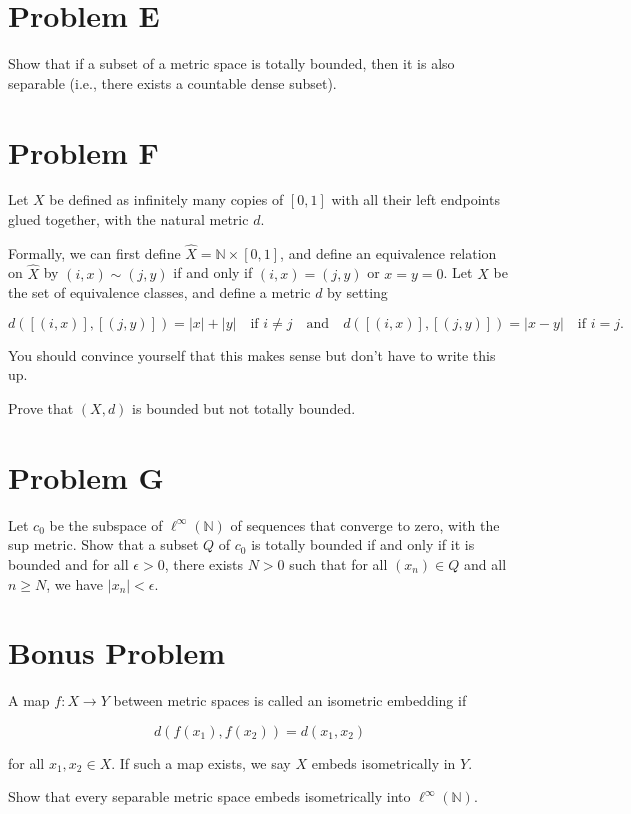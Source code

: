 \documentclass[lang=en,11pt]{template}
\begin{document}
\section*{Problem E}
Show that if a subset of a metric space is totally bounded, then it is also separable (i.e., there exists a countable dense subset).

\section*{Problem F}
Let \( X \) be defined as infinitely many copies of \( [0, 1] \) with all their left endpoints glued together, with the natural metric \( d \).

Formally, we can first define \( \hat{X} = \mathbb{N} \times [0, 1] \), and define an equivalence relation on \( \hat{X} \) by \( (i, x) \sim (j, y) \) if and only if \( (i, x) = (j, y) \) or \( x = y = 0 \). Let \( X \) be the set of equivalence classes, and define a metric \( d \) by setting

\[
d([ (i, x) ], [ (j, y) ]) = |x| + |y| \quad \text{if } i \neq j \quad \text{and} \quad d([ (i, x) ], [ (j, y) ]) = |x - y| \quad \text{if } i = j.
\]

You should convince yourself that this makes sense but don’t have to write this up.

Prove that \( (X, d) \) is bounded but not totally bounded.

\section*{Problem G}
Let \( c_0 \) be the subspace of \( \ell^\infty(\mathbb{N}) \) of sequences that converge to zero, with the sup metric. Show that a subset \( Q \) of \( c_0 \) is totally bounded if and only if it is bounded and for all \( \epsilon > 0 \), there exists \( N > 0 \) such that for all \( (x_n) \in Q \) and all \( n \geq N \), we have \( |x_n| < \epsilon \).

\section*{Bonus Problem}
A map \( f: X \to Y \) between metric spaces is called an isometric embedding if

\[
d(f(x_1), f(x_2)) = d(x_1, x_2)
\]

for all \( x_1, x_2 \in X \). If such a map exists, we say \( X \) embeds isometrically in \( Y \).

Show that every separable metric space embeds isometrically into \( \ell^\infty(\mathbb{N}) \).
\end{document}
